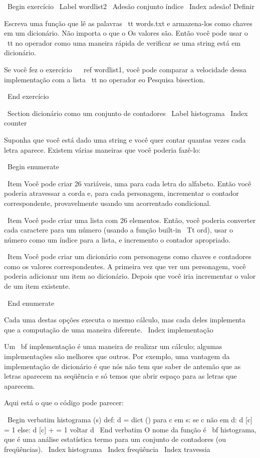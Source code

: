 \documentclass[10pt]{book}
\begin{document}
{{{{{{{\ Begin {} exercício
\ Label {} wordlist2
\ {Adesão conjunto} índice
\ Index {adesão! Definir}

Escreva uma função que lê as palavras {\ tt words.txt} e
armazena-los como chaves em um dicionário. Não importa o que o
Os valores são. Então você pode usar o {\ tt no} operador
como uma maneira rápida de verificar se uma string está em
dicionário.

Se você fez o exercício ~ \ ref {} wordlist1, você pode comparar a velocidade
dessa implementação com a lista {\ tt no} operador eo
Pesquisa bisection.

\ End {} exercício


\ Section {dicionário como um conjunto de contadores}
\ Label {} histograma
\ Index {counter}

Suponha que você está dado uma string e você quer contar quantas
vezes cada letra aparece. Existem várias maneiras que você poderia fazê-lo:

\ Begin {enumerate}

\ Item Você pode criar 26 variáveis, uma para cada letra do
alfabeto. Então você poderia atravessar a corda e, para cada
personagem, incrementar o contador correspondente, provavelmente usando
um acorrentado condicional.

\ Item Você pode criar uma lista com 26 elementos. Então, você poderia
converter cada caractere para um número (usando a função built-in
{\ Tt ord}), usar o número como um índice para a lista, e incremento
o contador apropriado.

\ Item Você pode criar um dicionário com personagens como chaves
e contadores como os valores correspondentes. A primeira vez que
ver um personagem, você poderia adicionar um item ao dicionário. Depois
que você iria incrementar o valor de um item existente.

\ End {enumerate}

Cada uma destas opções executa o mesmo cálculo, mas cada
deles implementa que a computação de uma maneira diferente.
\ Index {implementação}

Um {\ bf implementação} é uma maneira de realizar um cálculo;
algumas implementações são melhores que outros. Por exemplo,
uma vantagem da implementação de dicionário é que nós não
tem que saber de antemão que as letras aparecem na seqüência
e só temos que abrir espaço para as letras que aparecem.

Aqui está o que o código pode parecer:

\ Begin {verbatim}
histograma (s) def:
    d = dict ()
    para c em s:
        se c não em d:
            d [c] = 1
        else:
            d [c] + = 1
    voltar d
\ End {verbatim}
%
O nome da função é {\ bf histograma}, que é uma análise estatística
termo para um conjunto de contadores (ou freqüências).
\ Index {} histograma
\ Index {freqüência}
\ Index {travessia}

}}}}}}}
\end{document}

